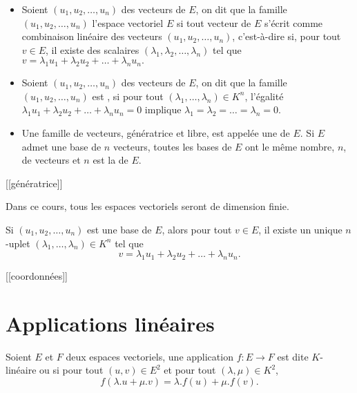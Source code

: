 \documentclass[class=report,crop=false]{standalone}
\begin{document}
\begin{definition}
\begin{itemize}
  \item Soient $(u_1,u_2,\dots,u_n)$ des vecteurs de $E$, 
  on dit que la famille $(u_1,u_2,\dots,u_n)$  
  l'espace vectoriel $E$ si tout vecteur de $E$ s'écrit comme 
  combinaison linéaire des vecteurs $(u_1,u_2,\dots,u_n)$, 
  c'est-à-dire si, pour tout $v\in E$, il existe des scalaires 
  $(\lambda_1,\lambda_2,\dots,\lambda_n)$ tel que 
  $v=\lambda_1u_1+\lambda_2u_2+\dots+\lambda_nu_n.$

  
  \item Soient $(u_1,u_2,\dots,u_n)$ des vecteurs de $E$, 
  on dit que la famille $(u_1,u_2,\dots,u_n)$ est , 
  si pour tout $(\lambda_1,\dots,\lambda_n)\in K^n$, 
  l'égalité $\lambda_1u_1+\lambda_2u_2+\dots+\lambda_nu_n=0$ 
  implique $\lambda_1=\lambda_2=\dots=\lambda_n=0$.

  
  \item Une famille de vecteurs, génératrice et libre, 
  est appelée une  de $E$. Si $E$ admet une base 
  de $n$ vecteurs, toutes les bases de $E$ ont le même nombre, 
  $n$, de vecteurs et $n$ est la  de $E$.
\end{itemize} 
\end{definition}

[[génératrice]]

Dans ce cours, tous les espaces vectoriels seront de dimension finie.

Si $(u_1,u_2,\dots,u_n)$ est une base de $E$, alors 
pour tout $v\in E$, il existe un unique $n$-uplet 
$(\lambda_1,\dots,\lambda_n)\in K^n$ tel que
$$v=\lambda_1u_1+\lambda_2u_2+\dots+\lambda_nu_n.$$

[[coordonnées]]



\section{Applications linéaires}

\begin{definition}
Soient $E$ et $F$ deux espaces vectoriels, 
une application $f: E\rightarrow F$ est dite $K$-linéaire ou 
 si pour tout $(u,v)\in E^2$ et 
pour tout $(\lambda,\mu)\in K^2$, 
$$f(\lambda. u+\mu. v)=\lambda. f(u)+\mu. f(v).$$  
\end{definition}
\end{document}
